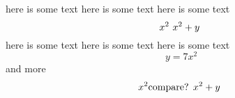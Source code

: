 here is some text here is some text here is some text
\[
	x^2 \text{
		$
			x^2+y
		$
	}
\]
here is some text here is some text here is some text
\[
	y=7x^2
\]
and more
\[
	x^2 \text{compare?
		$
			x^2+y
		$
	}
\]
